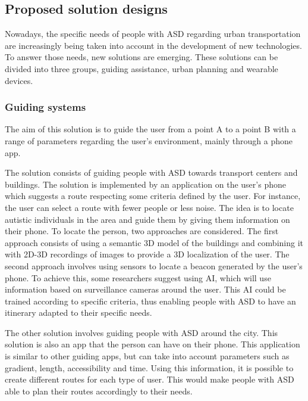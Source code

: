 \subsection{Proposed solution designs}

Nowadays, the specific needs of people with ASD regarding urban transportation are increasingly being taken into account in the development of new technologies. To answer those needs, new solutions are emerging. These solutions can be divided into three groups, guiding assistance, urban planning and wearable devices.

\subsubsection{Guiding systems}

The aim of this solution is to guide the user from a point A to a point B with a range of parameters regarding the user's environment, mainly through a phone app\cite{2017BuildingSmartAccessible}\cite{2023AccessibilityStrategiesPromote}.

The solution consists of guiding people with ASD towards transport centers and buildings\cite{2017BuildingSmartAccessible}. The solution is implemented by an application on the user's phone which suggests a route respecting some criteria defined by the user. For instance, the user can select a route with fewer people or less noise. The idea is to locate autistic individuals in the area and guide them by giving them information on their phone. To locate the person, two approaches are considered. The first approach consists of using a semantic 3D model of the buildings and combining it with 2D-3D recordings of images to provide a 3D localization of the user. The second approach involves using sensors to locate a beacon generated by the user's phone. To achieve this, some researchers suggest using AI, which will use information based on surveillance cameras around the user\cite{2017BuildingSmartAccessible}. This AI could be trained according to specific criteria, thus enabling people with ASD to have an itinerary adapted to their specific needs.

The other solution involves guiding people with ASD around the city\cite{2023AccessibilityStrategiesPromote}. This solution is also an app that the person can have on their phone. This application is similar to other guiding apps, but can take into account parameters such as gradient, length, accessibility and time. Using this information, it is possible to create different routes for each type of user. This would make people with ASD able to plan their routes accordingly to their needs.

